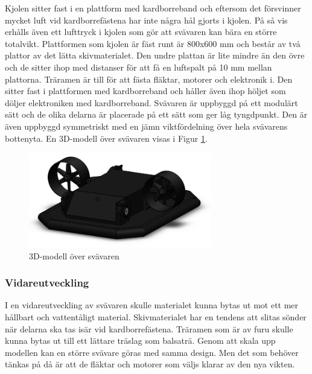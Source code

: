 Kjolen sitter fast i en plattform med kardborreband och eftersom det försvinner
mycket luft vid kardborrefästena har inte några hål gjorts i kjolen. På så vis
erhålls även ett lufttryck i kjolen som gör att svävaren kan bära en större
totalvikt. Plattformen som kjolen är fäst runt är 800x600 mm och består av två
plattor av det lätta skivmaterialet. Den undre plattan är lite mindre än den
övre och de sitter ihop med distanser för att få en luftspalt på 10 mm mellan
plattorna. Träramen är till för att fästa fläktar, motorer och elektronik i. Den
sitter fast i plattformen med kardborreband och håller även ihop höljet som
döljer elektroniken med kardborreband. Svävaren är uppbyggd på ett modulärt sätt
och de olika delarna är placerade på ett sätt som ger låg tyngdpunkt. Den är
även uppbyggd symmetriskt med en jämn viktfördelning över hela svävarens
bottenyta. En 3D-modell över svävaren visas i Figur \ref{fig:CAD_Hover}.
 
\begin{figure}[htbp!] 
\centering 
\includegraphics[width=8cm]{../includes/figures/CAD_Hovercraft.png} 
\caption{3D-modell över svävaren} 
\label{fig:CAD_Hover} 
\end{figure}

\subsubsection{Vidareutveckling}
I en vidareutveckling av svävaren skulle materialet kunna bytas ut mot ett mer
hållbart och vattentåligt material. Skivmaterialet har en tendens att slitas
sönder när delarna ska tas isär vid kardborrefästena. Träramen som är av furu
skulle kunna bytas ut till ett lättare träslag som balsaträ. Genom att skala upp
modellen kan en större svävare göras med samma design. Men det som behöver
tänkas på då är att de fläktar och motorer som väljs klarar av den nya vikten.
